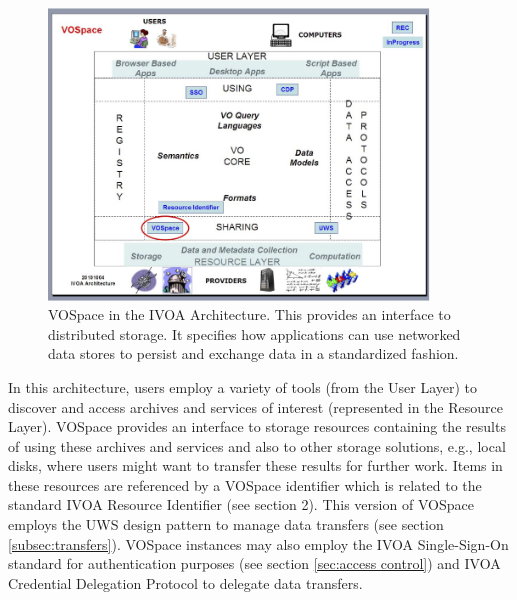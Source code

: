 \documentclass[11pt,a4paper]{ivoa}
\begin{document}
\begin{figure}
\centering


\includegraphics[width=0.9\textwidth]{archdiag.png}
\caption{VOSpace in the IVOA Architecture. This provides an interface to distributed storage. It specifies how applications can use networked data stores to persist and exchange data in a standardized fashion.}
\label{fig:archdiag}
\end{figure}

In this architecture, users employ a variety of tools (from the User Layer) to discover and access archives and services of interest (represented in the Resource Layer). VOSpace provides an interface to storage resources containing the results of using these archives and services and also to other storage solutions, e.g., local disks, where users might want to transfer these results for further work. Items in these resources are referenced by a VOSpace identifier which is related to the standard IVOA Resource Identifier (see section 2). This version of VOSpace employs the UWS design pattern \citep{std:UWS} to manage data transfers (see section \ref{subsec:transfers}). VOSpace instances may also employ the IVOA Single-Sign-On standard \citep{std:SSOAUTH2.0} for authentication purposes (see section \ref{sec:access control}) and IVOA Credential Delegation Protocol \citep{std:CDP} to delegate data transfers.
\end{document}
